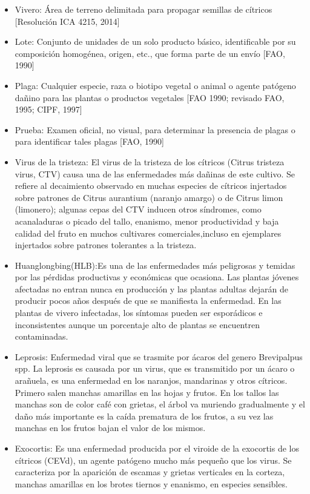 \begin{itemize}
\item Vivero: \'{A}rea de terreno delimitada para propagar semillas de c\'{i}tricos [Resoluci\'{o}n ICA 4215, 2014]
\item Lote: Conjunto de unidades de un solo producto b\'{a}sico, identificable por su composici\'{o}n homog\'{e}nea, origen, etc., que forma parte de un env\'{i}o [FAO, 1990] 
\item Plaga: Cualquier especie, raza o biotipo vegetal o animal o agente pat\'{o}geno da\~{n}ino para las plantas o productos vegetales [FAO 1990; revisado FAO, 1995; CIPF, 1997] 
\item Prueba: Examen oficial, no visual, para determinar la presencia de plagas o para identificar tales plagas [FAO, 1990] 
\item Virus de la tristeza: El virus de la tristeza de los c\'{i}tricos (Citrus tristeza virus, CTV) causa una de las enfermedades m\'{a}s
da\~{n}inas de este cultivo. Se refiere al decaimiento observado en muchas especies de c\'{i}tricos injertados sobre patrones de Citrus aurantium (naranjo amargo) o de Citrus limon (limonero); algunas cepas del CTV inducen otros s\'{i}ndromes, como acanaladuras o picado del tallo, enanismo, menor productividad y baja calidad del fruto en muchos cultivares comerciales,incluso en ejemplares injertados sobre patrones tolerantes a la tristeza.\cite{CTV}
\item Huanglongbing(HLB):Es una de las enfermedades m\'{a}s peligrosas y temidas por las p\'{e}rdidas productivas y econ\'{o}micas que ocasiona. Las plantas j\'{o}venes afectadas no entran nunca en producci\'{o}n y las plantas adultas dejar\'{a}n de producir pocos a\~{n}os despu\'{e}s de que se manifiesta la enfermedad. En las plantas de vivero infectadas, los s\'{i}ntomas pueden ser espor\'{a}dicos e inconsistentes aunque un porcentaje alto de plantas se encuentren contaminadas.\cite{HLB}
\item Leprosis: Enfermedad viral que se trasmite por \'{a}caros del genero Brevipalpus spp. La leprosis es causada por un virus, que es transmitido por un \'{a}caro o ara\~{n}uela, es una enfermedad en los naranjos, mandarinas y otros c\'{i}tricos. Primero salen manchas amarillas en las hojas y frutos. En los tallos las manchas son de color caf\'{e} con grietas, el \'{a}rbol va muriendo gradualmente y el da\~{n}o m\'{a}s importante es la ca\'{i}da prematura de los frutos, a su vez las manchas en los frutos bajan el valor de los mismos.\cite{LEP}
\item Exocortis: Es una enfermedad producida por el viroide de la exocortis de los c\'{i}tricos (CEVd), un agente pat\'{o}geno mucho m\'{a}s peque\~{n}o que los virus. Se caracteriza por la aparici\'{o}n de escamas y grietas verticales en la corteza, manchas amarillas en los brotes tiernos y enanismo, en especies sensibles.\cite{EXO}
\end{itemize}

